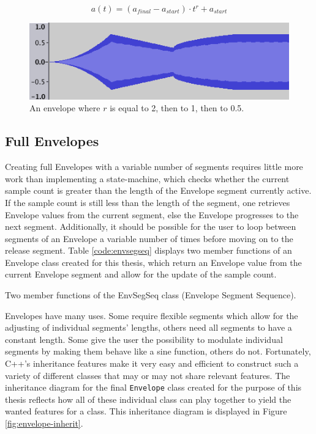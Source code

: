 \documentclass[12pt,twoside]{report}
\begin{document}
\begin{equation}
  a(t) = (a_{final} - a_{start}) \cdot t^r + a_{start}
  \label{eq:power}
\end{equation}

\begin{figure}
  \includegraphics[scale=0.7]{img/rates}
  \caption{An envelope where $r$ is equal to 2, then to 1, then to 0.5.}
  \label{fig:rates}
\end{figure}

\subsection{Full Envelopes}

Creating full Envelopes with a variable number of segments requires little more work than implementing a state-machine, which checks whether the current sample count is greater than the length of the Envelope segment currently active. If the sample count is still less than the length of the segment, one retrieves Envelope values from the current segment, else the Envelope progresses to the next segment. Additionally, it should be possible for the user to loop between segments of an Envelope a variable number of times before moving on to the release segment. Table \ref{code:envsegseq} displays two member functions of an Envelope class created for this thesis, which return an Envelope value from the current Envelope segment and allow for the update of the sample count.\\

\begin{table}
  \caption{Two member functions of the EnvSegSeq class (Envelope Segment Sequence).}
  \label{code:envsegseq}
\end{table}

\noindent Envelopes have many uses. Some require flexible segments which allow for the adjusting of individual segments' lengths, others need all segments to have a constant length. Some give the user the possibility to modulate individual segments by making them behave like a sine function, others do not. Fortunately, C++'s inheritance features make it very easy and efficient to construct such a variety of different classes that may or may not share relevant features. The inheritance diagram for the final \texttt{Envelope} class created for the purpose of this thesis reflects how all of these individual class can play together to yield the wanted features for a class. This inheritance diagram is displayed in Figure \ref{fig:envelope-inherit}.
\end{document}
